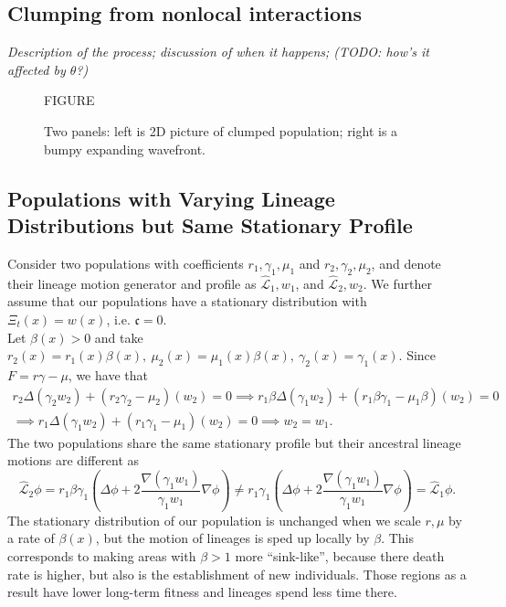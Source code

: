 \documentclass[12pt]{article}
\def \hat{\widehat}
\newcommand{\comment}[1]{{\color{blue} \it #1}}
\begin{document}
\subsection{Clumping from nonlocal interactions}

\comment{
    Description of the process;
    discussion of when it happens;
    (TODO: how's it affected by $\theta$?)
}

\begin{figure}
    \begin{center}
        FIGURE
    \end{center}
    \caption{
        Two panels: left is 2D picture of clumped population;
        right is a bumpy expanding wavefront.
        \label{fig:clumping}
    }
\end{figure}

\subsection{Populations with Varying Lineage Distributions but Same Stationary Profile}

Consider two populations with coefficients $r_1, \gamma_1, \mu_1$ and  $r_2, \gamma_2, \mu_2$, and denote their lineage motion generator and profile as $\hat{\mathcal{L}}_1,w_1$, and $\hat{\mathcal{L}}_2,w_2$. We further assume that our populations have a stationary distribution with $\Xi_t(x)=w(x)$, i.e. $\mathfrak{c}=0$.\\
Let $\beta(x)>0$ and take $r_2(x)=r_1(x)\beta(x),~ \mu_2(x)=\mu_1(x)\beta(x),~ \gamma_2(x)=\gamma_1(x)$. Since $F=r\gamma-\mu$, we have that 
\begin{multline}
\label{eq: same profile scaled}
r_2\Delta(\gamma_2 w_2)+(r_2\gamma_2-\mu_2)(w_2)=0\implies r_1\beta \Delta(\gamma_1 w_2)+(r_1\beta \gamma_1-\mu_1 \beta)(w_2)=0\\
\implies r_1 \Delta(\gamma_1 w_2)+(r_1 \gamma_1-\mu_1)(w_2)=0 \implies w_2=w_1.
\end{multline}
The two populations share the same stationary profile but their ancestral lineage motions are different as 
\begin{equation}
\label{eq: different generator scaled}
\hat{\mathcal{L}}_2 \phi = r_1 \beta \gamma_1\left(\Delta\phi+2\frac{\nabla(\gamma_1 w_1)}{\gamma_1 w_1}\nabla\phi\right)\neq r_1 \gamma_1\left(\Delta\phi+2\frac{\nabla(\gamma_1 w_1)}{\gamma_1 w_1}\nabla\phi\right) = \hat{\mathcal{L}}_1 \phi.
\end{equation}
The stationary distribution of our population is unchanged when we scale $r,\mu$ by a rate of $\beta(x)$,
but the motion of lineages is sped up locally by $\beta$.
This corresponds to making areas with $\beta > 1$ more ``sink-like'',
because there death rate is higher, but also is the establishment of new individuals. Those regions as a result have lower long-term fitness and lineages spend less time there.
\end{document}
